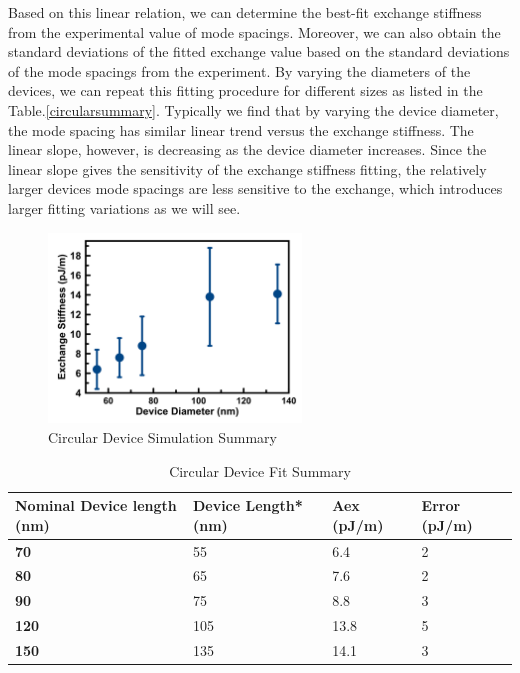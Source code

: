 Based on this linear relation, we can determine the best-fit exchange stiffness from the experimental value of mode spacings. Moreover, we can also obtain the standard deviations of the fitted exchange value based on the standard deviations of the mode spacings from the experiment. By varying the diameters of the devices, we can repeat this fitting procedure for different sizes as listed in the Table.\ref{circularsummary}. Typically we find that by varying the device diameter, the mode spacing has similar linear trend versus the exchange stiffness. The linear slope, however, is decreasing as the device diameter increases. Since the linear slope gives the sensitivity of the exchange stiffness fitting, the relatively larger devices mode spacings are less sensitive to the exchange, which introduces larger fitting variations as we will see.



\begin{figure}[!ht]
  \centering
  \includegraphics[width=0.6\textwidth]{fig/2018/sim/circular_summary}
   \caption{Circular Device Simulation Summary}
  \label{fig:circularsummary}
\end{figure}


\begin{table}[]
\centering
\begin{tabular}{|l|l|l|l|}
\hline
\textbf{Nominal Device length (nm)} & \textbf{Device Length* (nm)} & \textbf{Aex (pJ/m)} & \textbf{Error (pJ/m)} \\ \hline
\textbf{70} & 55 & 6.4 & 2 \\ \hline
\textbf{80} & 65 & 7.6 & 2 \\ \hline
\textbf{90} & 75 & 8.8 & 3 \\ \hline
\textbf{120} & 105 & 13.8 & 5 \\ \hline
\textbf{150} & 135 & 14.1 & 3 \\ \hline
\end{tabular}
\caption{Circular Device Fit Summary}
\label{cirexsummary}
\end{table}


